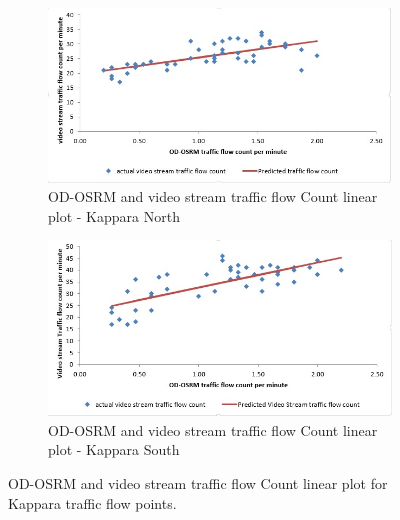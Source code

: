 \documentclass[12pt, a4paper]{report}
\theoremstyle{definition}
\theoremstyle{definition}%
\theoremstyle{definition}%
\theoremstyle{definition}%
\theoremstyle{definition}%
\theoremstyle{definition}%
\begin{document}
\begin{figure}[!] 
	\centering
	\begin{subfigure}{0.8\textwidth}
		\centering
		\includegraphics[width=\linewidth]{traffic_flow_count_KN_line_plot.jpg} 
		\caption{\scriptsize{OD-OSRM and video stream traffic flow Count linear plot - Kappara North}} \label{fig:traffic_flow_count_KN_lineplot}
	\end{subfigure}
	
	\vspace{1cm}
	\begin{subfigure}{0.8\textwidth}
		\centering
		\includegraphics[width=\linewidth]{traffic_flow_count_KS_line_plot.jpg} 
		\caption{\scriptsize{OD-OSRM and video stream traffic flow Count linear plot - Kappara South}}
		\label{fig:traffic_flow_count_KS_lineplot}
	\end{subfigure}
        \caption[Linear plot for Kappara northbound and southbound traffic flow regression model]{OD-OSRM and video stream traffic flow Count linear plot for Kappara traffic flow points.}
        \label{fig:kappara_traffic_flow_count_plot}
\end{figure}
\end{document}
